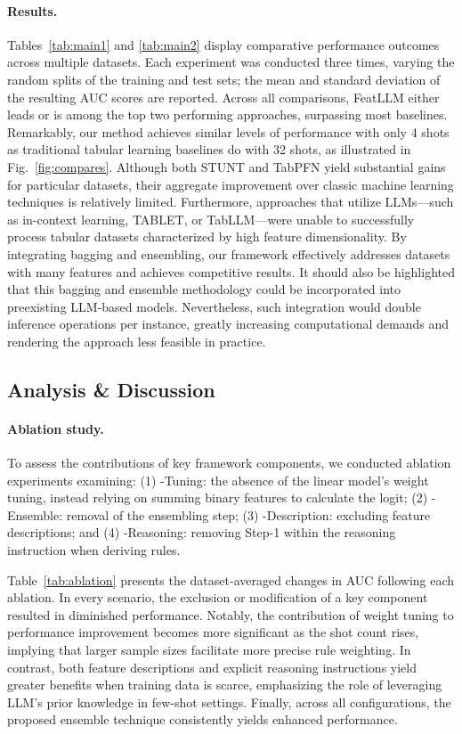 \vspace*{-0.12in}
\paragraph{Results.}
Tables~\ref{tab:main1} and \ref{tab:main2} display comparative performance outcomes across multiple datasets. Each experiment was conducted three times, varying the random splits of the training and test sets; the mean and standard deviation of the resulting AUC scores are reported. Across all comparisons, \textsf{FeatLLM} either leads or is among the top two performing approaches, surpassing most baselines. Remarkably, our method achieves similar levels of performance with only 4 shots as traditional tabular learning baselines do with 32 shots, as illustrated in Fig.~\ref{fig:compares}. Although both STUNT and TabPFN yield substantial gains for particular datasets, their aggregate improvement over classic machine learning techniques is relatively limited. Furthermore, approaches that utilize LLMs—such as in-context learning, TABLET, or TabLLM—were unable to successfully process tabular datasets characterized by high feature dimensionality. By integrating bagging and ensembling, our framework effectively addresses datasets with many features and achieves competitive results. It should also be highlighted that this bagging and ensemble methodology could be incorporated into preexisting LLM-based models. Nevertheless, such integration would double inference operations per instance, greatly increasing computational demands and rendering the approach less feasible in practice. 

\subsection{Analysis \& Discussion}
\label{sec:analysis}
\paragraph{Ablation study.} To assess the contributions of key framework components, we conducted ablation experiments examining: (1) \textsf{-Tuning}: the absence of the linear model's weight tuning, instead relying on summing binary features to calculate the logit; (2) \textsf{-Ensemble}: removal of the ensembling step; (3) \textsf{-Description}: excluding feature descriptions; and (4) \textsf{-Reasoning}: removing Step-1 within the reasoning instruction when deriving rules.

Table~\ref{tab:ablation} presents the dataset-averaged changes in AUC following each ablation. In every scenario, the exclusion or modification of a key component resulted in diminished performance. Notably, the contribution of weight tuning to performance improvement becomes more significant as the shot count rises, implying that larger sample sizes facilitate more precise rule weighting. In contrast, both feature descriptions and explicit reasoning instructions yield greater benefits when training data is scarce, emphasizing the role of leveraging LLM’s prior knowledge in few-shot settings. Finally, across all configurations, the proposed ensemble technique consistently yields enhanced performance.

